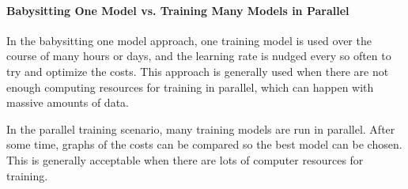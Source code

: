 \documentclass{article}
\begin{document}
\paragraph{Babysitting One Model vs. Training Many Models in Parallel}

In the babysitting one model approach, one training model is used over the course of many hours or days, and the learning rate is nudged every so often to try and optimize the costs.  This approach is generally used when there are not enough computing resources for training in parallel, which can happen with massive amounts of data.

In the parallel training scenario, many training models are run in parallel.  After some time, graphs of the costs can be compared so the best model can be chosen.  This is generally acceptable when there are lots of computer resources for training.
\end{document}
